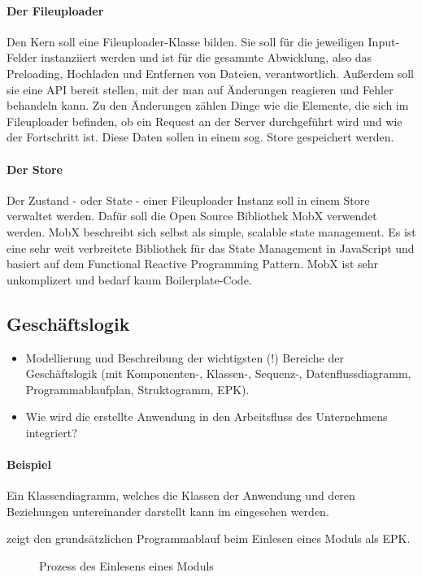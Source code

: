 \paragraph{Der Fileuploader} Den Kern soll eine Fileuploader-Klasse bilden. Sie soll für die jeweiligen Input-Felder instanziiert werden und ist für die gesammte Abwicklung, also das Preloading, Hochladen und Entfernen von Dateien, verantwortlich. Außerdem soll sie eine API bereit stellen, mit der man auf Änderungen reagieren und Fehler behandeln kann. Zu den Änderungen zählen Dinge wie die Elemente, die sich im Fileuploader befinden, ob ein Request an der Server durchgeführt wird und wie der Fortschritt ist. Diese Daten sollen in einem sog. Store gespeichert werden.

\paragraph{Der Store} Der Zustand - oder State - einer Fileuploader Instanz soll in einem Store verwaltet werden. Dafür soll die Open Source Bibliothek MobX verwendet werden. MobX beschreibt sich selbst als \glqq simple, scalable state management\grqq{}. Es ist eine sehr weit verbreitete Bibliothek für das State Management in JavaScript und basiert auf dem Functional Reactive Programming Pattern. MobX ist sehr unkomplizert und bedarf kaum Boilerplate-Code.

\subsection{Geschäftslogik}
\label{sec:Geschaeftslogik}

\begin{itemize}
	\item Modellierung und Beschreibung der wichtigsten (!) Bereiche der Geschäftslogik (\zB mit Kom\-po\-nen\-ten-, Klassen-, Sequenz-, Datenflussdiagramm, Programmablaufplan, Struktogramm, \ac{EPK}).
	\item Wie wird die erstellte Anwendung in den Arbeitsfluss des Unternehmens integriert?
\end{itemize}

\paragraph{Beispiel}
Ein Klassendiagramm, welches die Klassen der Anwendung und deren Beziehungen untereinander darstellt kann im  eingesehen werden.

 zeigt den grundsätzlichen Programmablauf beim Einlesen eines Moduls als \ac{EPK}.
\begin{figure}[htb]
\centering
{}
\caption{Prozess des Einlesens eines Moduls}
\label{fig:Modulimport}
\end{figure}


